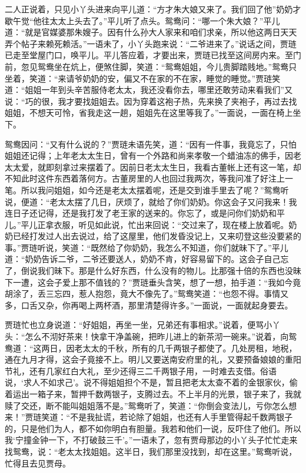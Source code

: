 \documentclass[12pt,oneside]{book}
\begin{document}
二人正说着，只见小丫头进来向平儿道：“方才朱大娘又来了。我们回了他”奶奶才歇午觉“他往太太上头去了。”平儿听了点头。鸳鸯问：“哪一个朱大娘？”平儿道：“就是官媒婆那朱嫂子。因有什么孙大人家来和咱们求亲，所以他这两日天天弄个帖子来赖死赖活。”一语未了，小丫头跑来说：“二爷进来了。”说话之间，贾琏已走至堂屋门口，唤平儿。平儿答应着，才要出来，贾琏已找至这间房内来。至门前，忽见鸳鸯坐在炕上，便煞住脚，笑道：“鸳鸯姐姐，今儿贵脚踏贱地。”鸳鸯只坐着，笑道：“来请爷奶奶的安，偏又不在家的不在家，睡觉的睡觉。”贾琏笑道：“姐姐一年到头辛苦服侍老太太，我还没看你去，哪里还敢劳动来看我们”又说：“巧的很，我才要找姐姐去。因为穿着这袍子热，先来换了夹袍子，再过去找姐姐，不想天可怜，省我走这一趟，姐姐先在这里等我了。”一面说，一面在椅上坐下。

鸳鸯因问：“又有什么说的？”贾琏未语先笑，道：“因有一件事，我竟忘了，只怕姐姐还记得；上年老太太生日，曾有一个外路和尚来孝敬一个蜡油冻的佛手，因老太太爱，就即刻拿过来摆着了。因前日老太太生日，我看古董帐上还有这一笔，却不知此时这件东西着落何方。古董房里的人也回过我两次，等我问准了好注上一笔。所以我问姐姐，如今还是老太太摆着呢，还是交到谁手里去了呢？”鸳鸯听说，便道：“老太太摆了几日，厌烦了，就给了你们奶奶。你这会子又问我来！我连日子还记得，还是我打发了老王家的送来的。你忘了，或是问你们奶奶和平儿。”平儿正拿衣服，听见如此说，忙出来回说：“交过来了，现在楼上放着呢。奶奶已经打发过人出去说过，给了这屋里，他们发昏没记上，又来叨登这些没要紧的事。”贾琏听说，笑道：“既然给了你奶奶，我怎么不知道，你们就昧下了。”平儿道：“奶奶告诉二爷，二爷还要送人，奶奶不肯，好容易留下的。这会子自己忘了，倒说我们昧下。那是什么好东西，什么没有的物儿。比那强十倍的东西也没昧下一遭，这会子爱上那不值钱的？”贾琏垂头含笑，想了一想，拍手道：“我如今竟胡涂了，丢三忘四，惹人抱怨，竟大不像先了。”鸳鸯笑道：“也怨不得。事情又多，口舌又杂，你再喝上两杯酒，那里清楚得许多。”一面说，一面就起身要去。

贾琏忙也立身说道：“好姐姐，再坐一坐，兄弟还有事相求。”说着，便骂小丫头：“怎么不沏好茶来！快拿干净盖碗，把昨儿进上的新茶沏一碗来。”说着，向鸳鸯道：“这两日，因老太太的千秋，所有的几千两银子都使了。几处房租，地税，通在九月才得，这会子竟接不上。明儿又要送南安府里的礼，又要预备娘娘的重阳节礼，还有几家红白大礼，至少还得三二千两银子用，一时难去支借。俗语说，‘求人不如求己’。说不得姐姐担个不是，暂且把老太太查不着的金银家伙，偷着运出一箱子来，暂押千数两银子，支腾过去。不上半月的光景，银子来了，我就赎了交还，断不能叫姐姐落不是。”鸳鸯听了，笑道：“你倒会变法儿，亏你怎么想来！”贾琏笑道：“不是我扯谎，若论除了姐姐，也还有人手里管得起千数两银子的，只是他们为人，都不如你明白有胆量。我若和他们一说，反吓住了他们。所以我‘宁撞金钟一下，不打破鼓三千’。”一语未了，忽有贾母那边的小丫头子忙忙走来找鸳鸯，说：“老太太找姐姐。这半日，我们那里没找到，却在这里。”鸳鸯听说，忙得且去见贾母。
\end{document}
